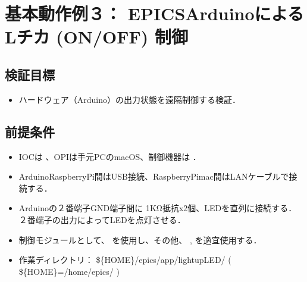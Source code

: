 \documentclass[letterpaper,10pt,dvipdfmx]{sphinxmanual}
\begin{document}
\section{基本動作例３： EPICS\sphinxhyphen{}ArduinoによるLチカ (ON/OFF) 制御}
\label{\detokenize{epics/rst/example3__arduino_LEDcontrol01:epics-arduinol-on-off}}\label{\detokenize{epics/rst/example3__arduino_LEDcontrol01::doc}}

\subsection{検証目標}
\label{\detokenize{epics/rst/example3__arduino_LEDcontrol01:id1}}\begin{itemize}
\item {} 
ハードウェア（Arduino）の出力状態を遠隔制御する検証．

\end{itemize}


\subsection{前提条件}
\label{\detokenize{epics/rst/example3__arduino_LEDcontrol01:id2}}\begin{itemize}
\item {} 
IOCは  、OPIは手元PCのmacOS、制御機器は  ．

\item {} 
Arduino\sphinxhyphen{}RaspberryPi間はUSB接続、RaspberryPi\sphinxhyphen{}mac間はLANケーブルで接続する．

\item {} 
Arduinoの２番端子\sphinxhyphen{}GND端子間に 1KΩ抵抗x2個、LEDを直列に接続する．２番端子の出力によってLEDを点灯させる．

\item {} 
制御モジュールとして、  を使用し、その他、  ,  を適宜使用する．

\item {} 
作業ディレクトリ： \$\{HOME\}/epics/app/lightupLED/  ( \$\{HOME\}=/home/epics/ )

\end{itemize}
\end{document}
